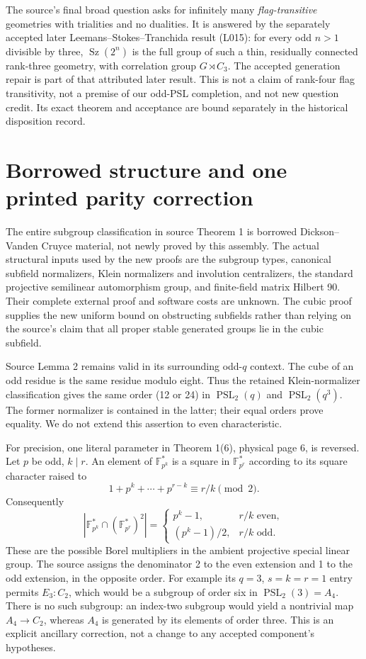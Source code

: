 \documentclass[11pt,a4paper]{article}
\begin{document}
The source's final broad question asks for infinitely many
\emph{flag-transitive} geometries with trialities and no dualities.
It is answered by the separately accepted later Leemans--Stokes--Tranchida
result (L015): for every odd $n>1$ divisible by three, $\operatorname{Sz}(2^n)$
is the full group of such a thin, residually connected rank-three
geometry, with correlation group $G\rtimes C_3$. The accepted generation
repair is part of that attributed later result. This is not a claim of
rank-four flag transitivity, not a premise of our odd-PSL completion,
and not new question credit. Its exact theorem and acceptance are bound
separately in the historical disposition record.

\section*{Borrowed structure and one printed parity correction}
The entire subgroup classification in source Theorem 1 is borrowed
Dickson--Vanden Cruyce material, not newly proved by this assembly.
The actual structural inputs used by the new proofs are the subgroup
types, canonical subfield normalizers, Klein normalizers and involution
centralizers, the standard projective semilinear automorphism group,
and finite-field matrix Hilbert 90. Their complete external proof and
software costs are unknown. The cubic proof supplies the new uniform
bound on obstructing subfields rather than relying on the source's
claim that all proper stable generated groups lie in the cubic subfield.

Source Lemma 2 remains valid in its surrounding odd-$q$ context.
The cube of an odd residue is the same residue modulo eight. Thus the
retained Klein-normalizer classification gives the same order (12 or 24)
in $\operatorname{PSL}_2(q)$ and $\operatorname{PSL}_2(q^3)$.
The former normalizer is contained in the latter; their equal orders
prove equality. We do not extend this assertion to even characteristic.

For precision, one literal parameter in Theorem 1(6), physical page 6,
is reversed. Let $p$ be odd, $k\mid r$. An element of
$\mathbb F_{p^k}^{*}$ is a square in $\mathbb F_{p^r}^{*}$ according
to its square character raised to
\[
       1+p^k+\cdots+p^{r-k}\equiv r/k\pmod2.
\]
Consequently
\[
 \left|\mathbb F_{p^k}^{*}\cap(\mathbb F_{p^r}^{*})^2\right|
 =\begin{cases}p^k-1,&r/k\text{ even},\\
                (p^k-1)/2,&r/k\text{ odd}.
   \end{cases}
\]
These are the possible Borel multipliers in the ambient projective
special linear group. The source assigns the denominator 2 to the
even extension and 1 to the odd extension, in the opposite order.
For example its $q=3$, $s=k=r=1$ entry permits $E_3:C_2$, which
would be a subgroup of order six in $\operatorname{PSL}_2(3)=A_4$.
There is no such subgroup: an index-two subgroup would yield a
nontrivial map $A_4\to C_2$, whereas $A_4$ is generated by its
elements of order three. This is an explicit ancillary correction,
not a change to any accepted component's hypotheses.
\end{document}
